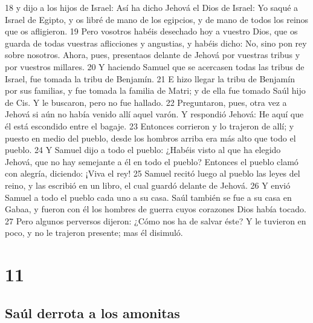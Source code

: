 18 y dijo a los hijos de Israel: Así ha dicho Jehová el Dios de Israel: Yo saqué a Israel de Egipto, y os libré de mano de los egipcios, y de mano de todos los reinos que os afligieron.
19 Pero vosotros habéis desechado hoy a vuestro Dios, que os guarda de todas vuestras aflicciones y angustias, y habéis dicho: No, sino pon rey sobre nosotros. Ahora, pues, presentaos delante de Jehová por vuestras tribus y por vuestros millares.
20 Y haciendo Samuel que se acercasen todas las tribus de Israel, fue tomada la tribu de Benjamín.
21 E hizo llegar la tribu de Benjamín por sus familias, y fue tomada la familia de Matri; y de ella fue tomado Saúl hijo de Cis. Y le buscaron, pero no fue hallado.
22 Preguntaron, pues, otra vez a Jehová si aún no había venido allí aquel varón. Y respondió Jehová: He aquí que él está escondido entre el bagaje.
23 Entonces corrieron y lo trajeron de allí; y puesto en medio del pueblo, desde los hombros arriba era más alto que todo el pueblo.
24 Y Samuel dijo a todo el pueblo: ¿Habéis visto al que ha elegido Jehová, que no hay semejante a él en todo el pueblo? Entonces el pueblo clamó con alegría, diciendo: ¡Viva el rey!
25 Samuel recitó luego al pueblo las leyes del reino, y las escribió en un libro, el cual guardó delante de Jehová.
26 Y envió Samuel a todo el pueblo cada uno a su casa. Saúl también se fue a su casa en Gabaa, y fueron con él los hombres de guerra cuyos corazones Dios había tocado.
27 Pero algunos perversos dijeron: ¿Cómo nos ha de salvar éste? Y le tuvieron en poco, y no le trajeron presente; mas él disimuló.

\chapter{11}

\section*{Saúl derrota a los amonitas}


